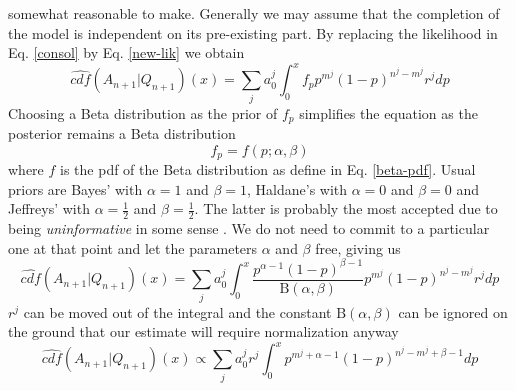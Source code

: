 \documentclass[runningheads]{llncs}
\begin{document}
somewhat reasonable to make. Generally we may assume that the
completion of the model is independent on its pre-existing part.
By replacing the likelihood in Eq. \ref{consol} by Eq. \ref{new-lik}
we obtain
\begin{equation}
  \label{betaconsol}
  \hat{cdf}(A_{n+1}|Q_{n+1})(x) = \sum_j a_0^j \int_0^x f_p p^{m^j}(1-p)^{n^j-m^j}
  r^j dp
\end{equation}
Choosing a Beta distribution as the prior of $f_p$ simplifies the
equation as the posterior remains a Beta distribution
\begin{equation}
f_p = f(p; \alpha, \beta)
\end{equation}
where $f$ is the pdf of the Beta distribution as define in
Eq. \ref{beta-pdf}. Usual priors are Bayes' with $\alpha = 1$ and
$\beta = 1$, Haldane's with $\alpha = 0$ and $\beta = 0$ and Jeffreys'
with $\alpha = \frac{1}{2}$ and $\beta = \frac{1}{2}$. The latter is
probably the most accepted due to being \emph{uninformative} in some
sense \cite{Jeffreys46Invariant}. We do not need to commit to a
particular one at that point and let the parameters $\alpha$ and
$\beta$ free, giving us
\begin{equation}
  \label{betaconsol-1}
  \hat{cdf}(A_{n+1}|Q_{n+1})(x) = \sum_j a_0^j \int_0^x
  \frac{p^{\alpha - 1}(1-p)^{\beta - 1}}{\mathrm{B}(\alpha, \beta)}
  p^{m^j}(1-p)^{n^j-m^j} r^j dp
\end{equation}
$r^j$ can be moved out of the integral and the constant
$\mathrm{B}(\alpha, \beta)$ can be ignored on the ground that our
estimate will require normalization anyway
\begin{equation}
  \label{betaconsol-2}
  \hat{cdf}(A_{n+1}|Q_{n+1})(x) \propto \sum_j a_0^j r^j
  \int_0^x p^{m^j+\alpha - 1}(1-p)^{n^j-m^j+\beta - 1} dp
\end{equation}
\end{document}

